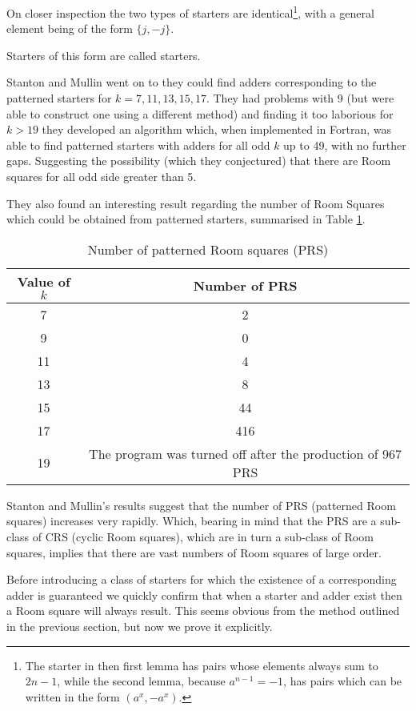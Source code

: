 On closer inspection the two types of starters are identical\footnote{The starter in then first lemma has pairs whose elements always sum to $2n-1$, while the second lemma, because $a^{n-1}=-1$, has pairs which can be written in the form $(a^x,-a^x)$.}, with a general element being of the form $\{j, -j\}$.

Starters of this form are called  starters.

Stanton and Mullin went on to they could find adders corresponding to the patterned starters for $k = 7, 11, 13, 15, 17$.
They had problems with 9 (but were able to construct one using a different method) and finding it too laborious for $k > 19$ they developed an algorithm which, when implemented in Fortran, was able to find patterned starters with adders for all odd $k$ up to 49, with no further gaps.
Suggesting the possibility (which they conjectured) that there are Room squares for all odd side greater than 5.

They also found an interesting result regarding the number of Room Squares which could be obtained from patterned starters, summarised in Table \ref{tab:patterned}. 

\begin{table}[h!]
  \begin{center}
    \begin{tabular}{c|c}
    Value of $k$ & Number of PRS \\ \hline
    7 & 2 \\
    9 & 0 \\
    11 & 4 \\
    13 & 8 \\
    15 & 44 \\
    17 & 416 \\
    19 & The program was turned off after the production of 967 PRS
    \end{tabular}
  \end{center}
  \caption{Number of patterned Room squares (PRS)}
  \label{tab:patterned}
\end{table}

Stanton and Mullin's results suggest that the number of PRS (patterned Room squares) increases very rapidly.
Which, bearing in mind that the PRS are a sub-class of CRS (cyclic Room squares), which are in turn a sub-class of Room squares, implies that there are vast numbers of Room squares of large order.

Before introducing a class of starters for which the existence of a corresponding adder is guaranteed we quickly confirm that when a starter and adder exist then a Room square will always result.
This seems obvious from the method outlined in the previous section, but now we prove it explicitly.

